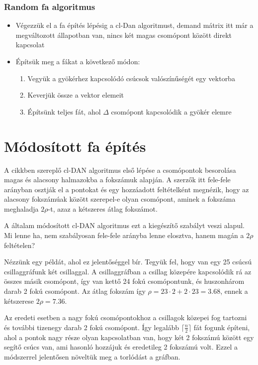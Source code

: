 \documentclass[12pt]{report}
\begin{document}
\subsubsection{Random fa algoritmus}
\begin{itemize}
	\item Végezzük el a fa építés lépésig a cl-Dan algoritmust, demand mátrix itt már a megváltozott állapotban van, nincs két magas csomópont között direkt kapcsolat
	\item Építsük meg a fákat a következő módon:
	\begin{enumerate}
		\item Vegyük a gyökérhez kapcsolódó csúcsok valószínűségét egy vektorba
		\item Keverjük össze a vektor elemeit
		\item Építsünk teljes fát, ahol $\Delta$ csomópont kapcsolódik a gyökér elemre
	\end{enumerate}
\end{itemize}

\section{Módosított fa építés}


A cikkben \cite{avin_demand-aware_nodate} szereplő cl-DAN algoritmus első lépése a csomópontok besorolása magas és alacsony halmazokba a fokszámuk alapján. 
A szerzők itt fele-fele arányban osztják el a pontokat és egy hozzáadott feltételként megnézik, hogy az alacsony fokszámúak között szerepel-e olyan csomópont, aminek a fokszáma meghaladja \(2\rho\)-t, azaz a kétszeres átlag fokszámot.

A általam módosított cl-DAN algoritmus ezt a kiegészítő szabályt veszi alapul.
Mi lenne ha, nem szabályosan fele-fele arányba lenne elosztva, hanem magán a \(2\rho\) feltételen?

Nézzünk egy példát, ahol ez jelentőséggel bír.
Tegyük fel, hogy van egy 25 csúcsú csillaggráfunk két csillaggal.
A csillaggráfban a csillag közepére kapcsolódik rá az összes másik csomópont, így van kettő 24 fokú csomópontunk, és huszonhárom darab 2 fokú csomópont. 
Az átlag fokszám így \(\rho=23\cdot2+2\cdot23=3.68\), ennek a kétszerese \(2\rho=7.36\).

Az eredeti esetben a nagy fokú csomópontokhoz a csillagok közepei fog tartozni és további tizenegy darab 2 fokú csomópont. 
Így legalább $\lceil\frac{n}{2}\rceil$ fát fogunk építeni, ahol a pontok nagy része olyan kapcsolatban van, hogy két 2 fokszámú között egy segítő csúcs van, ami hasonló hozzájuk és eredetileg 2 fokszámú volt. 
Ezzel a módszerrel jelentősen növeltük meg a torlódást a gráfban.
\end{document}
